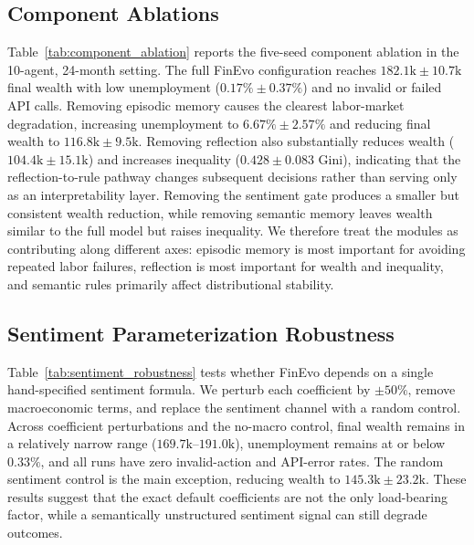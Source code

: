 \ifdefined\FinEvoAllowHistoricalPrePZeroEvidence\else
{}
\fi

\subsection{Component Ablations}
\label{sec:component_ablations}

Table~\ref{tab:component_ablation} reports the five-seed component ablation in
the 10-agent, 24-month setting.  The full FinEvo configuration reaches
$182.1\mathrm{k}\pm10.7\mathrm{k}$ final wealth with low unemployment
($0.17\%\pm0.37\%$) and no invalid or failed API calls.  Removing episodic
memory causes the clearest labor-market degradation, increasing unemployment to
$6.67\%\pm2.57\%$ and reducing final wealth to
$116.8\mathrm{k}\pm9.5\mathrm{k}$.  Removing reflection also substantially
reduces wealth ($104.4\mathrm{k}\pm15.1\mathrm{k}$) and increases inequality
($0.428\pm0.083$ Gini), indicating that the reflection-to-rule pathway changes
subsequent decisions rather than serving only as an interpretability layer.
Removing the sentiment gate produces a smaller but consistent wealth reduction,
while removing semantic memory leaves wealth similar to the full model but
raises inequality.  We therefore treat the modules as contributing along
different axes: episodic memory is most important for avoiding repeated labor
failures, reflection is most important for wealth and inequality, and semantic
rules primarily affect distributional stability.

\subsection{Sentiment Parameterization Robustness}
\label{sec:sentiment_robustness}

Table~\ref{tab:sentiment_robustness} tests whether FinEvo depends on a single
hand-specified sentiment formula.  We perturb each coefficient by $\pm50\%$,
remove macroeconomic terms, and replace the sentiment channel with a random
control.  Across coefficient perturbations and the no-macro control, final
wealth remains in a relatively narrow range
($169.7\mathrm{k}$--$191.0\mathrm{k}$), unemployment remains at or below
$0.33\%$, and all runs have zero invalid-action and API-error rates.  The random
sentiment control is the main exception, reducing wealth to
$145.3\mathrm{k}\pm23.2\mathrm{k}$.  These results suggest that the exact
default coefficients are not the only load-bearing factor, while a semantically
unstructured sentiment signal can still degrade outcomes.

